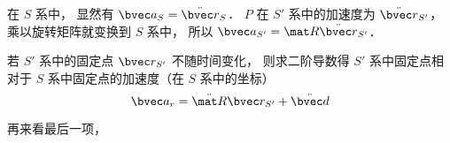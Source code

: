在 $S$ 系中， 显然有 $\bvec a_S = \ddot{\bvec r}_S$． $P$ 在 $S'$ 系中的加速度为 $\ddot{\bvec r}_{S'}$， 乘以旋转矩阵就变换到 $S$ 系中， 所以 $\bvec a_{S'} = \mat R \ddot{\bvec r}_{S'}$．

若 $S'$ 系中的固定点 $\bvec r_{S'}$ 不随时间变化， 则求二阶导数得 $S'$ 系中固定点相对于 $S$ 系中固定点的加速度（在 $S$ 系中的坐标）
\begin{equation}
\bvec a_r = \ddot{\mat R} \bvec r_{S'} + \ddot{\bvec d}
\end{equation}

再来看最后一项， 

